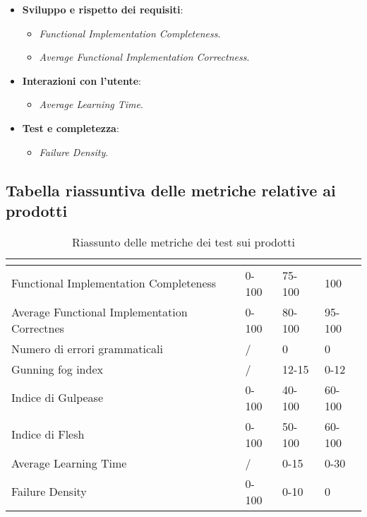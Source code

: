 \begin{itemize}
	\item{\textbf{Sviluppo e rispetto dei requisiti}:
		\begin{itemize}
			\item{\emph{Functional Implementation Completeness}.}
			\item{\emph{Average Functional Implementation Correctness}.}			
		\end{itemize}	
	}
	\item{\textbf{Interazioni con l'utente}: 
		\begin{itemize}
			\item{\emph{Average Learning Time}.}
		\end{itemize}	
	}
	\item{\textbf{Test e completezza}: 
	\begin{itemize}
		\item{\emph{Failure Density}.}
	\end{itemize}	
}
\end{itemize}

\subsection{Tabella riassuntiva delle metriche relative ai prodotti}
\renewcommand{\arraystretch}{1.5}
\begin{table}[H]
	\centering
	\begin{tabular}{|C{4cm}|C{3cm}|C{3cm}|C{3cm}|}
		\hline
		\textbf{\color{title_text}{Nome Metrica}} & \textbf{\color{title_text}{Intervallo limite}} & \textbf{\color{title_text}{Range accettabile}} & \textbf{\color{title_text}{Range ottimale}} \\ \hline
		Functional Implementation Completeness & 0-100 & 75-100 & 100 \\ \hline
		Average Functional Implementation Correctnes&0-100&80-100&95-100 \\ \hline
		Numero di errori grammaticali & / & 0 & 0 \\ \hline
		Gunning fog index & / &12-15&0-12 \\ \hline
		Indice di Gulpease & 0-100& 40-100& 60-100 \\ \hline
		Indice di Flesh& 0-100 & 50-100& 60-100\\ \hline
		Average Learning Time& / &0-15 & 0-30 \\ \hline
		Failure Density&0-100&0-10&0\\ \hline
	\end{tabular}
	\caption{Riassunto delle metriche dei test sui prodotti}
	\label{tabella:riassunto metriche dei test sui prodotti}
\end{table}
\renewcommand{\arraystretch}{1}
\pagebreak